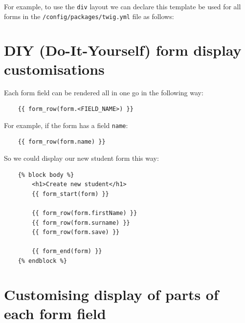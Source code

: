 \documentclass[a4paperpaper,openright]{book}
\newenvironment{Shaded}{}{}
\newcommand{\AttributeTok}[1]{\textcolor[rgb]{0.49,0.56,0.16}{#1}}
\newcommand{\FunctionTok}[1]{\textcolor[rgb]{0.02,0.16,0.49}{#1}}
\newcommand{\KeywordTok}[1]{\textcolor[rgb]{0.00,0.44,0.13}{\textbf{#1}}}
\newcommand{\StringTok}[1]{\textcolor[rgb]{0.25,0.44,0.63}{#1}}
\begin{document}
For example, to use the \texttt{div} layout we can declare this template
be used for all forms in the \texttt{/config/packages/twig.yml} file as
follows:

\begin{Shaded}
\end{Shaded}

\hypertarget{diy-do-it-yourself-form-display-customisations}{%
\section{DIY (Do-It-Yourself) form display
customisations}\label{diy-do-it-yourself-form-display-customisations}}

Each form field can be rendered all in one go in the following way:

\begin{verbatim}
    {{ form_row(form.<FIELD_NAME>) }}
\end{verbatim}

For example, if the form has a field \texttt{name}:

\begin{verbatim}
    {{ form_row(form.name) }}
\end{verbatim}

So we could display our new student form this way:

\begin{verbatim}
    {% block body %}
        <h1>Create new student</h1>
        {{ form_start(form) }}

        {{ form_row(form.firstName) }}
        {{ form_row(form.surname) }}
        {{ form_row(form.save) }}

        {{ form_end(form) }}
    {% endblock %}
\end{verbatim}

\hypertarget{customising-display-of-parts-of-each-form-field}{%
\section{Customising display of parts of each form
field}\label{customising-display-of-parts-of-each-form-field}}
\end{document}
